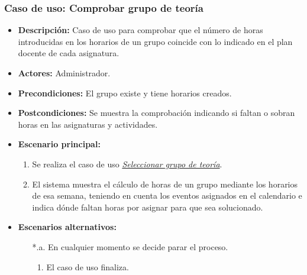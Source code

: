 \documentclass{book}
\begin{document}
\subsubsection*{Caso de uso: Comprobar grupo de teoría}
\begin{itemize}
\item{\bf Descripción:} Caso de uso para comprobar que el número de horas introducidas en los horarios de un grupo coincide con lo indicado en el plan docente de cada asignatura.
\item{\bf Actores:} Administrador.
\item{\bf Precondiciones:} El grupo existe y tiene horarios creados.
\item{\bf Postcondiciones:} Se muestra la comprobación indicando si faltan o sobran horas en las asignaturas y actividades.
\item{\bf Escenario principal:}
	\begin{enumerate}
	\item Se realiza el caso de uso {\em \hyperref[select_grupo]{Seleccionar grupo de teoría}}.
	\item El sistema muestra el cálculo de horas de un grupo mediante los horarios de esa semana, teniendo en cuenta los eventos asignados en el calendario e indica dónde faltan horas por asignar para que sea solucionado.
	\end{enumerate}
\item{\bf Escenarios alternativos:}
	\begin{itemize}
		\item[*.a.] En cualquier momento se decide parar el proceso.
		\begin{enumerate}
			\item El caso de uso finaliza.
		\end{enumerate}
	\end{itemize}
\end{itemize}

\pagebreak
\end{document}
